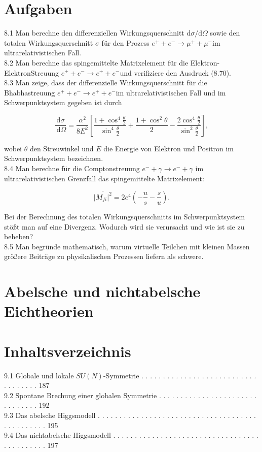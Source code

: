 \documentclass[10pt, letterpaper]{article}
\begin{document}
\section*{Aufgaben}
8.1 Man berechne den differenziellen Wirkungsquerschnitt $\mathrm{d} \sigma / \mathrm{d} \Omega$ sowie den totalen Wirkungsquerschnitt $\sigma$ für den Prozess $e^{+}+e^{-} \longrightarrow \mu^{+}+\mu^{-}$im ultrarelativistischen Fall.\\
8.2 Man berechne das spingemittelte Matrixelement für die Elektron-ElektronStreuung $e^{+}+e^{-} \longrightarrow e^{+}+e^{-}$und verifiziere den Ausdruck (8.70).\\
8.3 Man zeige, dass der differenzielle Wirkungsquerschnitt für die Bhabhastreuung $e^{+}+e^{-} \longrightarrow e^{+}+e^{-}$im ultrarelativistischen Fall und im Schwerpunktsystem gegeben ist durch

$$
\frac{\mathrm{d} \sigma}{\mathrm{~d} \Omega}=\frac{\alpha^{2}}{8 E^{2}}\left[\frac{1+\cos ^{4} \frac{\theta}{2}}{\sin ^{4} \frac{\theta}{2}}+\frac{1+\cos ^{2} \theta}{2}-\frac{2 \cos ^{4} \frac{\theta}{2}}{\sin ^{2} \frac{\theta}{2}}\right],
$$

wobei $\theta$ den Streuwinkel und $E$ die Energie von Elektron und Positron im Schwerpunktsystem bezeichnen.\\
8.4 Man berechne für die Comptonstreuung $e^{-}+\gamma \longrightarrow e^{-}+\gamma$ im ultrarelativistischen Grenzfall das spingemittelte Matrixelement:

$$
\overline{\left|M_{f i}\right|^{2}}=2 e^{4}\left(-\frac{u}{s}-\frac{s}{u}\right) .
$$

Bei der Berechnung des totalen Wirkungsquerschnitts im Schwerpunktsystem stößt man auf eine Divergenz. Wodurch wird sie verursacht und wie ist sie zu beheben?\\
8.5 Man begründe mathematisch, warum virtuelle Teilchen mit kleinen Massen größere Beiträge zu physikalischen Prozessen liefern als schwere.

\section*{Abelsche und nichtabelsche Eichtheorien}
\section*{Inhaltsverzeichnis}
9.1 Globale und lokale $S U(N)$-Symmetrie . . . . . . . . . . . . . . . . . . . . . . . . . . . . . . . . . . . 187\\
9.2 Spontane Brechung einer globalen Symmetrie . . . . . . . . . . . . . . . . . . . . . . . . . . . . . . . 192\\
9.3 Das abelsche Higgsmodell . . . . . . . . . . . . . . . . . . . . . . . . . . . . . . . . . . . . . . . . . . . . . . . 195\\
9.4 Das nichtabelsche Higgsmodell . . . . . . . . . . . . . . . . . . . . . . . . . . . . . . . . . . . . . . . . . . . . 197
\end{document}

